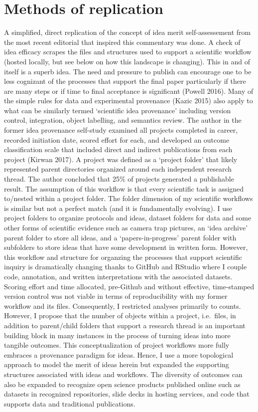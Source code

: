 \documentclass[]{elsarticle} %
\begin{document}
\section{Methods of replication}\label{methods-of-replication}

A simplified, direct replication of the concept of idea merit
self-assessement from the most recent editorial that inspired this
commentary was done. A check of idea efficacy scrapes the files and
structures used to support a scientific workflow (hosted locally, but
see below on how this landscape is changing). This in and of itself is a
superb idea. The need and pressure to publish can encourage one to be
less cognizant of the processes that support the final paper
particularly if there are many steps or if time to final acceptance is
significant (Powell 2016). Many of the simple rules for data and
experimental provenance (Kazic 2015) also apply to what can be similarly
termed `scientific idea provenance' including version control,
integration, object labelling, and semantics review. The author in the
former idea provenance self-study examined all projects completed in
career, recorded initiation date, scored effort for each, and developed
an outcome classification scale that included direct and indirect
publications from each project (Kirwan 2017). A project was defined as a
`project folder' that likely represented parent directories organized
around each independent research thread. The author concluded that 25\%
of projects generated a publishable result. The assumption of this
workflow is that every scientific task is assigned to/nested within a
project folder. The folder dimension of my scientific workflows is
similar but not a perfect match (and it is fundamentally evolving). I
use project folders to organize protocols and ideas, dataset folders for
data and some other forms of scientific evidence such as camera trap
pictures, an `idea archive' parent folder to store all ideas, and a
`papers-in-progress' parent folder with subfolders to store ideas that
have some development in written form. However, this workflow and
structure for organzing the processes that support scientific inquiry is
dramatically changing thanks to GitHub and RStudio where I couple code,
annotation, and written interpretations with the associated datasets.
Scoring effort and time allocated, pre-Github and without effective,
time-stamped version control was not viable in terms of reproducibility
with my former workflow and its files. Consequently, I restricted
analyses primarily to counts. However, I propose that the number of
objects within a project, i.e.~files, in addition to parent/child
folders that support a research thread is an important building block in
many instances in the process of turning ideas into more tangible
outcomes. This conceptualization of project workflows more fully
embraces a provenance paradigm for ideas. Hence, I use a more
topological approach to model the merit of ideas herein but expanded the
supporting structures associated with ideas and workflows. The diversity
of outcomes can also be expanded to recognize open science products
published online such as datasets in recognized repositories, slide
decks in hosting services, and code that supports data and traditional
publications.
\end{document}
